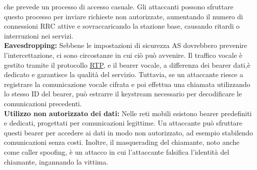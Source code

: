 \documentclass[english]{article}
\begin{document}
che prevede un processo di accesso casuale. Gli attaccanti possono sfruttare questo
processo per inviare richieste non autorizzate, aumentando il numero di connessioni
RRC attive e sovraccaricando la stazione base, causando ritardi o interruzioni nei servizi.
\\[0.2cm]
\textbf{Eavesdropping:} Sebbene le impostazioni di sicurezza AS dovrebbero prevenire
l'intercettazione, ci sono circostanze in cui ciò può avvenire. Il traffico vocale è
gestito tramite il protocollo \hyperlink{RTP}{RTP},
e il bearer vocale, a differenza dei bearer dati,è dedicato e garantisce la qualità del servizio.
Tuttavia, se un attaccante riesce a
registrare la comunicazione vocale cifrata e poi effettua una chiamata utilizzando lo
stesso ID del bearer, può estrarre il keystream necessario per decodificare le
comunicazioni precedenti.
\\[0.2cm]
\textbf{Utilizzo non autorizzato dei dati:} Nelle reti mobili esistono bearer predefiniti
e dedicati, progettati per comunicazioni legittime. Un attaccante può sfruttare questi
bearer per accedere ai dati in modo non autorizzato, ad esempio stabilendo
comunicazioni senza costi. Inoltre, il masquerading del chiamante,
noto anche come caller spoofing, è un attacco in cui l'attaccante falsifica l'identità
del chiamante, ingannando la vittima.
\end{document}

